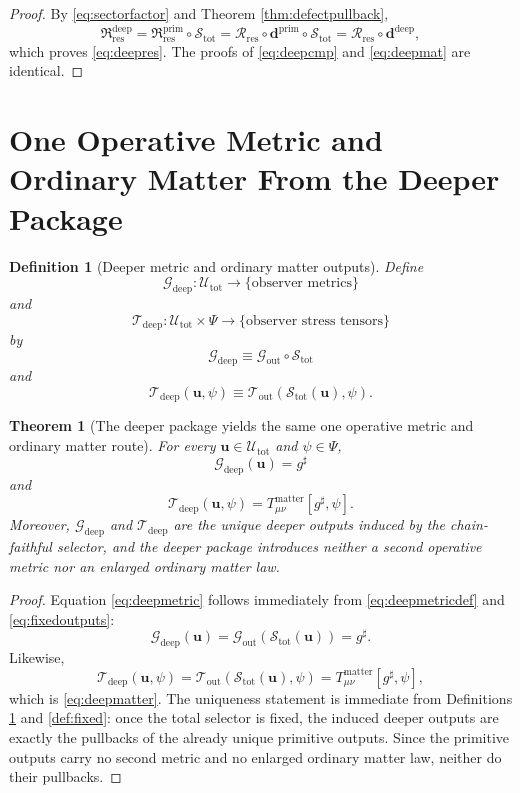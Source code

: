 \documentclass[11pt]{article}
\newcommand{\CompletedMetric}{g^{\sharp}}
\newcommand{\PrimDefectTuple}{\mathbf d^{\mathrm{prim}}}
\newcommand{\DeepDefectTuple}{\mathbf d^{\mathrm{deep}}}
\newcommand{\PrimResidualSector}{\mathfrak R_{\mathrm{res}}^{\mathrm{prim}}}
\newcommand{\DeepResidualSector}{\mathfrak R_{\mathrm{res}}^{\mathrm{deep}}}
\newcommand{\ResidualRead}{\mathscr R_{\mathrm{res}}}
\newcommand{\MetricOut}{\mathscr G_{\mathrm{out}}}
\newcommand{\MatterOut}{\mathscr T_{\mathrm{out}}}
\newcommand{\DeepMetricOut}{\mathscr G_{\mathrm{deep}}}
\newcommand{\DeepMatterOut}{\mathscr T_{\mathrm{deep}}}
\newcommand{\DeepShell}{\mathcal U_{\mathrm{tot}}}
\newcommand{\ChainSelectTriple}{\mathcal S_{\mathrm{tot}}}
\newtheorem{definition}{Definition}
\newtheorem{theorem}{Theorem}
\begin{document}
\begin{proof}
By \eqref{eq:sectorfactor} and Theorem \ref{thm:defectpullback},
\[
\DeepResidualSector
=
\PrimResidualSector\circ\ChainSelectTriple
=
\ResidualRead\circ\PrimDefectTuple\circ\ChainSelectTriple
=
\ResidualRead\circ\DeepDefectTuple,
\]
which proves \eqref{eq:deepres}. The proofs of \eqref{eq:deepcmp} and \eqref{eq:deepmat} are identical.
\end{proof}

\section{One Operative Metric and Ordinary Matter From the Deeper Package}

\begin{definition}[Deeper metric and ordinary matter outputs]
\label{def:deepmetric}
Define
\[
\DeepMetricOut:\DeepShell\to\{\text{observer metrics}\}
\]
and
\[
\DeepMatterOut:\DeepShell\times\Psi\to\{\text{observer stress tensors}\}
\]
by
\begin{equation}
\DeepMetricOut
\equiv
\MetricOut\circ\ChainSelectTriple
\label{eq:deepmetricdef}
\end{equation}
and
\begin{equation}
\DeepMatterOut(\mathbf u,\psi)
\equiv
\MatterOut(\ChainSelectTriple(\mathbf u),\psi).
\label{eq:deepmatterdef}
\end{equation}
\end{definition}

\begin{theorem}[The deeper package yields the same one operative metric and ordinary matter route]
\label{thm:deepmetric}
For every \(\mathbf u\in\DeepShell\) and \(\psi\in\Psi\),
\begin{equation}
\DeepMetricOut(\mathbf u)=\CompletedMetric
\label{eq:deepmetric}
\end{equation}
and
\begin{equation}
\DeepMatterOut(\mathbf u,\psi)
=
T_{\mu\nu}^{\mathrm{matter}}[\CompletedMetric,\psi].
\label{eq:deepmatter}
\end{equation}
Moreover, \(\DeepMetricOut\) and \(\DeepMatterOut\) are the unique deeper outputs induced by the chain-faithful selector, and the deeper package introduces neither a second operative metric nor an enlarged ordinary matter law.
\end{theorem}

\begin{proof}
Equation \eqref{eq:deepmetric} follows immediately from \eqref{eq:deepmetricdef} and \eqref{eq:fixedoutputs}:
\[
\DeepMetricOut(\mathbf u)
=
\MetricOut(\ChainSelectTriple(\mathbf u))
=
\CompletedMetric.
\]
Likewise,
\[
\DeepMatterOut(\mathbf u,\psi)
=
\MatterOut(\ChainSelectTriple(\mathbf u),\psi)
=
T_{\mu\nu}^{\mathrm{matter}}[\CompletedMetric,\psi],
\]
which is \eqref{eq:deepmatter}. The uniqueness statement is immediate from Definitions \ref{def:deepmetric} and \ref{def:fixed}: once the total selector is fixed, the induced deeper outputs are exactly the pullbacks of the already unique primitive outputs. Since the primitive outputs carry no second metric and no enlarged ordinary matter law, neither do their pullbacks.
\end{proof}
\end{document}

